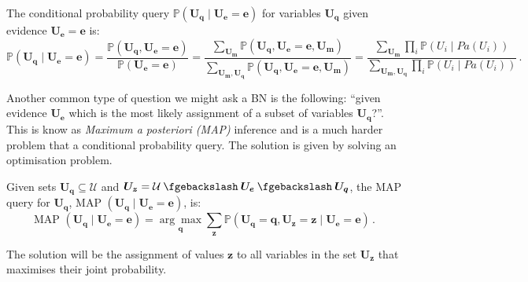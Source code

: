 \begin{definition}
	The conditional probability query $\mathbb{P}(\boldsymbol{U_q} \mid \boldsymbol{U_e}=\boldsymbol{e})$ for variables $\boldsymbol{U_q}$ given evidence $\boldsymbol{U_e}=\boldsymbol{e}$ is:
\begin{equation*} 
	\mathbb{P}(\boldsymbol{U_q} \mid \boldsymbol{U_e}=\boldsymbol{e}) = \frac{\mathbb{P}(\boldsymbol{U_q},\boldsymbol{U_e}=\boldsymbol{e})}{\mathbb{P}(\boldsymbol{U_e}=\boldsymbol{e})} = \frac{ \sum\limits_{\boldsymbol{U_m}} \mathbb{P}(\boldsymbol{U_q},\boldsymbol{U_e}=\boldsymbol{e},\boldsymbol{U_m}) }{ \sum\limits_{\boldsymbol{U_m, U_q}} \mathbb{P}(\boldsymbol{U_q},\boldsymbol{U_e}=\boldsymbol{e},\boldsymbol{U_m}) } = 
	\frac{ \sum\limits_{\boldsymbol{U_m}} \prod_i \mathbb{P}(U_i \mid Pa(U_i)) }{ \sum\limits_{\boldsymbol{U_m, U_q}} \prod_i \mathbb{P}(U_i \mid Pa(U_i)) } \,.
\end{equation*}
\end{definition}

Another common type of question we might ask a BN is the following: \enquote{given evidence $\boldsymbol{U_e}$ which is the most likely assignment of a subset of variables $\boldsymbol{U_q}$?}.
This is know as \textit{Maximum a posteriori (MAP)} inference and is a much harder problem that a conditional probability query.
The solution is given by solving an optimisation problem.
\begin{definition}  \label{def:map}
Given sets $\boldsymbol{U_q} \subseteq \mathcal{U}$ and $\boldsymbol{U_z} = \mathcal{U} \mysetminus \boldsymbol{U_e} \mysetminus \boldsymbol{U_q}$, the MAP query for $\boldsymbol{U_q}$, $\text{MAP }( \boldsymbol{U_q} \mid \boldsymbol{U_e}=\boldsymbol{e} )$, is:
	\begin{equation*}
		\text{MAP }( \boldsymbol{U_q} \mid \boldsymbol{U_e}=\boldsymbol{e} ) = \underset{\boldsymbol{q}}{\arg\max} \sum\limits_{\boldsymbol{z}} \mathbb{P}(\boldsymbol{U_q}=\boldsymbol{q}, \boldsymbol{U_z}=\boldsymbol{z} \mid \boldsymbol{U_e}=\boldsymbol{e}) \,.
	\end{equation*}
\end{definition}
The solution will be the assignment of values $\boldsymbol{z}$ to all variables in the set $\boldsymbol{U_z}$ that maximises their joint probability.


